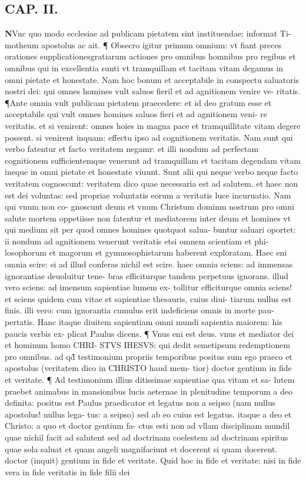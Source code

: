 \documentclass{article}
\begin{document}
\begin{pages}
\endnumbering\beginnumbering\section{CAP. II.}\pstart \huge\textbf{N}\normalsize Vnc quo modo ecclesiae ad publicam pietatem sint instituendae: informat Ti- motheum apostolus ac ait. ¶ Obsecro igitur primum omnium: vt fiant preces orationes supplicationesgratiarum actiones pro omnibus homnibus pro regibus et omnibus qui in excellentia sunti vt tramquillam et tacitam vitam degamus in omni pietate et honestate. Nam hoc bonum et acceptabile in conspectu saluatoris nostri dei: qui omnes homines vult saluos fieril et ad agnitionem venire ve- ritatis. ¶Ante omnia vult publicam pietatem praecedere: et id deo gratum esse et acceptabile qui vult omnes homines saluos fieri et ad agnitionem veni- re veritatis. et si venirent: omnes hoies in magna pace et tramquillitate vitam degere possent. si venirent inquam: effectu ipso ad cognitionem veritatis. Nam sunt qui verbo fatentur et facto veritatem negamr: et illi nondum ad perfectam cognitionem sufficientemque  venerunt ad tramquillam et tacitam degendam vitam ineque  in omni pietate et honestate viuunt. Sunt alii qui neque  verbo neque  facto veritatem cognoscunt: veritatem dico quae necessaria est ad salutem. et haec non est dei voluntas: sed propriae voluntatis eorum a veritatis luce incuruatio. Nam qui vnum non co- gnoscunt deum et vnum Christum dominm nostrum pro omni salute mortem oppetiisse non fatentur et mediatorem inter deum et homines vt qui medium sit per quod  omnes homines quotquot salua- buntur saluari oportet: ii nondum ad agnitionem venerunt veritatis etsi omnem scientiam et phi- losophorum et magorum et gymnosophistarum haberent exploratam. Haec eni omnia scire: si ad illud conferas nichil est scire. haec omnia sciens: ad immensas ignorantiae deuoluitur tene- bras efficiturque  tandem perpetuus ignorans. illud vero sciens: ad imensum sapientiae lumem ex- tollitur efficiturque  omnia sciens! et sciens quidem cum vitae et sapientiae thesauris, cuius diui- tiarum nullus est finis. illi vero: cum ignorantia  cumulus erit indeficiens omnis in morte pau- pertatis. Hanc itaque  diuitem sapientiam omni mundi sapientia maiorem: his paucis verbis ex- plicat Paulus dicens. ¶ Vnus eni est deus. vnus et mediator dei et hominum homo CHRI- STVS IHESVS: qui dedit semetipsum redemptionem pro omnibus. ad qd̃ testimonium propriis   temporibus positus sum ego praeco et apostolus (veritatem dico in CHRISTO haud mem-   tior) doctor gentium in fide et veritate. ¶ Ad testimonium illius ditissimae sapientiae qua vitam et sa- lutem praebet animabus in mansionibus lucis aeternae  in plenitudine temporum a deo definita: positus est Paulus praedicator et legatus non a seipso (nam nullus apostolus! nullus lega- tus: a seipso) sed ab eo cuius est legatus. itaque  a deo et Christo: a quo et doctor gentium fa- ctus esti non ad vllam disciplinam mundil quae nichil facit ad salutent sed ad doctrinam coelestem  ad doctrinam spiritus  quae sola saluat et quam angeli magnifaciunt  et docerent si quam docerent. doctor (inquit) gentium in fide et veritate. Quid hoc in fide et veritate: nisi in fide vera  in fide veritatis in fide filii dei  
\end{pages}
\end{document}
